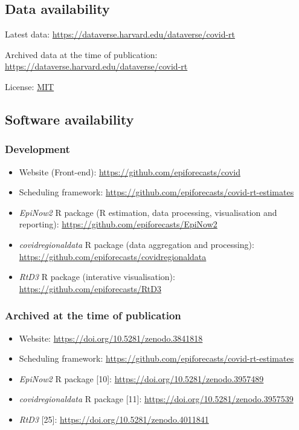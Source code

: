 \documentclass[
]{article}
\providecommand{\tightlist}{%
  \setlength{\itemsep}{0pt}\setlength{\parskip}{0pt}}
\begin{document}
\hypertarget{data-availability}{%
\subsection{Data availability}\label{data-availability}}

Latest data: \url{https://dataverse.harvard.edu/dataverse/covid-rt}

Archived data at the time of publication:
\url{https://dataverse.harvard.edu/dataverse/covid-rt}

License: \href{https://opensource.org/licenses/MIT}{MIT}

\hypertarget{software-availability}{%
\subsection{Software availability}\label{software-availability}}

\hypertarget{development}{%
\subsubsection{Development}\label{development}}

\begin{itemize}
\tightlist
\item
  Website (Front-end): \url{https://github.com/epiforecasts/covid}
\item
  Scheduling framework:
  \url{https://github.com/epiforecasts/covid-rt-estimates}
\item
  \emph{EpiNow2} R package (R estimation, data processing, visualisation
  and reporting): \url{https://github.com/epiforecasts/EpiNow2}
\item
  \emph{covidregionaldata} R package (data aggregation and processing):
  \url{https://github.com/epiforecasts/covidregionaldata}
\item
  \emph{RtD3} R package (interative visualisation):
  \url{https://github.com/epiforecasts/RtD3}
\end{itemize}

\hypertarget{archived-at-the-time-of-publication}{%
\subsubsection{Archived at the time of
publication}\label{archived-at-the-time-of-publication}}

\begin{itemize}
\tightlist
\item
  Website: \url{https://doi.org/10.5281/zenodo.3841818}
\item
  Scheduling framework:
  \url{https://github.com/epiforecasts/covid-rt-estimates}
\item
  \emph{EpiNow2} R package {[}10{]}:
  \url{https://doi.org/10.5281/zenodo.3957489}
\item
  \emph{covidregionaldata} R package {[}11{]}:
  \url{https://doi.org/10.5281/zenodo.3957539}
\item
  \emph{RtD3} {[}25{]}: \url{https://doi.org/10.5281/zenodo.4011841}
\end{itemize}
\end{document}
